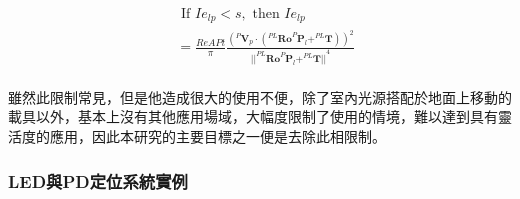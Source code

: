 \begin{description}
            \begin{equation}
                \label{eqn:model_parallel_restrict}
                \begin{aligned}
                    &\text { If } Ie_{lp}<s ,\text{ then }Ie_{lp} \\
                        &= \frac{ReAPt}{ \pi}
                    \frac{
                            {( ^{P}\boldsymbol{V}_p \cdot 
                                (
                                    ^{PL} \boldsymbol{Ro}^{P}\boldsymbol{P}_l
                                    + ^{PL}\boldsymbol{T}
                                )
                            )}^2
                     } 
                        {
                            {
                                ||
                                    ^{PL}\boldsymbol{Ro}^{P}\boldsymbol{P}_l+^{PL}\boldsymbol{T}
                                ||
                            }^{4}
                        }\\
                \end{aligned}
            \end{equation}

            \qquad
            雖然此限制常見，但是他造成很大的使用不便，除了室內光源搭配於地面上移動的載具以外，基本上沒有其他應用場域，大幅度限制了使用的情境，難以達到具有靈活度的應用，因此本研究的主要目標之一便是去除此相限制。
     

        \end{description}
        


    \subsubsection{LED與PD定位系統實例}
    \label{chp:LEDPD_case}

